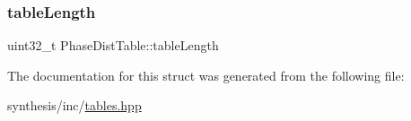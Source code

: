 \mbox{\label{struct_phase_dist_table_a1b871e67ce74c58645cd378ab683bc5d}} 
\subsubsection{\texorpdfstring{table\+Length}{tableLength}}
{\footnotesize\ttfamily uint32\+\_\+t Phase\+Dist\+Table\+::table\+Length}



The documentation for this struct was generated from the following file\+:\begin{DoxyCompactItemize}
\item 
synthesis/inc/\mbox{\hyperlink{inc_2tables_8hpp}{tables.\+hpp}}\end{DoxyCompactItemize}
